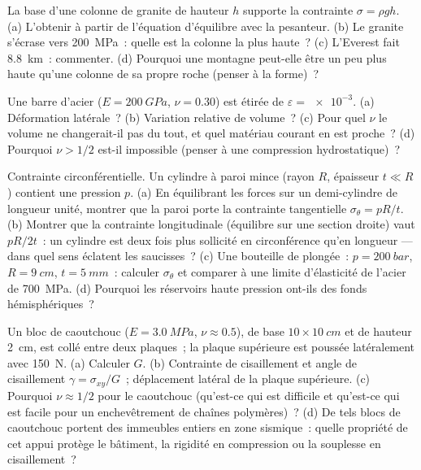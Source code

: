 \begin{exercise}[$\star$]\label{exo:b3:continuum-elasticity:3}
La base d'une colonne de granite de hauteur $h$ supporte la contrainte $\sigma
= \rho gh$. (a) L'obtenir à partir de l'équation d'équilibre avec la
pesanteur. (b) Le granite s'écrase vers \qty{200}{MPa}~: quelle est la
colonne la plus haute~? (c) L'Everest fait \qty{8.8}{km}~: commenter.
(d) Pourquoi une montagne peut-elle être un peu plus haute qu'une
colonne de sa propre roche (penser à la forme)~?
\end{exercise}

\begin{exercise}[$\star$]\label{exo:b3:continuum-elasticity:4}
Une barre d'acier ($E = \qty{200}{GPa}$, $\nu = 0.30$) est étirée de
$\varepsilon = \num{e-3}$. (a) Déformation latérale~? (b) Variation
relative de volume~? (c) Pour quel $\nu$ le volume ne changerait-il pas
du tout, et quel matériau courant en est proche~? (d) Pourquoi
$\nu > 1/2$ est-il impossible (penser à une compression
hydrostatique)~?
\end{exercise}

\begin{exercise}[$\star\star$]\label{exo:b3:continuum-elasticity:5}
Contrainte circonférentielle. Un cylindre à paroi mince (rayon $R$, épaisseur $t \ll
R$) contient une pression $p$. (a) En équilibrant les forces sur un
demi-cylindre de longueur unité, montrer que la paroi porte la
contrainte tangentielle $\sigma_\theta = pR/t$. (b) Montrer que la
contrainte longitudinale (équilibre sur une section droite) vaut $pR/2t$~: un cylindre est deux fois plus
sollicité en circonférence qu'en longueur --- dans quel sens éclatent
les saucisses~? (c) Une bouteille de plongée~: $p =
\qty{200}{bar}$, $R = \qty{9}{cm}$, $t = \qty{5}{mm}$~: calculer
$\sigma_\theta$ et comparer à une limite d'élasticité de l'acier de
\qty{700}{MPa}. (d) Pourquoi les réservoirs haute pression ont-ils des
fonds hémisphériques~?
\end{exercise}

\begin{exercise}[$\star\star$]\label{exo:b3:continuum-elasticity:6}
Un bloc de caoutchouc ($E = \qty{3.0}{MPa}$, $\nu \approx 0.5$), de base $10
\times \qty{10}{cm}$ et de hauteur \qty{2}{cm}, est collé entre deux
plaques~; la plaque supérieure est poussée latéralement avec
\qty{150}{N}. (a) Calculer $G$. (b) Contrainte de cisaillement et angle
de cisaillement $\gamma = \sigma_{xy}/G$~; déplacement latéral de la
plaque supérieure. (c) Pourquoi $\nu \approx 1/2$ pour le caoutchouc
(qu'est-ce qui est difficile et qu'est-ce qui est facile pour un
enchevêtrement de chaînes polymères)~? (d) De tels blocs de caoutchouc
portent des immeubles entiers en zone sismique~: quelle propriété de
cet appui protège le bâtiment, la rigidité en compression ou la
souplesse en cisaillement~?
\end{exercise}

